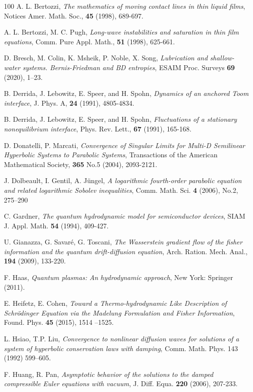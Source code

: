 \documentclass[leqno]{amsart}
\theoremstyle{plain}
\theoremstyle{definition}
\theoremstyle{remark}
\theoremstyle{plain}
\theoremstyle{plain}
\numberwithin{equation}{section}
\begin{document}
\begin{thebibliography}{100}
 A. L. Bertozzi, \emph{The mathematics of moving contact lines in thin liquid films}, Notices Amer. Math. Soc., {\bf 45} (1998), 689-697.

 A. L. Bertozzi, M. C. Pugh, \emph{Long-wave instabilities and saturation in thin film equations}, Comm. Pure Appl. Math., {\bf 51} (1998),  625-661.

 D. Bresch, M. Colin, K. Msheik, P. Noble, X. Song, \emph{Lubrication and shallow-water systems. Bernis-Friedman and BD entropies}, ESAIM Proc. Surveys {\bf 69} (2020), 1--23.

 B. Derrida, J. Lebowitz, E. Speer, and H. Spohn, \emph{Dynamics of an anchored Toom interface}, J. Phys. A, {\bf 24} (1991), 4805-4834.

 B. Derrida, J. Lebowitz, E. Speer, and H. Spohn, \emph{Fluctuations of a stationary nonequilibrium interface}, Phys. Rev. Lett., {\bf 67} (1991), 165-168.

 D. Donatelli, P. Marcati, \emph{Convergence of Singular Limits for Multi-D Semilinear Hyperbolic Systems to Parabolic Systems}, Transactions of the American Mathematical Society, {\bf 365} No.5 (2004), 2093-2121.

 J. Dolbeault, I. Gentil, A. J\"ungel, \emph{A logarithmic fourth-order parabolic equation and related logarithmic Sobolev inequalities}, Comm. Math. Sci. {\bf 4} (2006),  No.2, 275--290


 C. Gardner, \emph{The quantum hydrodynamic model for semiconductor devices}, SIAM J. Appl. Math. {\bf 54} (1994), 409-427.

 U. Gianazza, G. Savar\'e, G. Toscani, \emph{The Wasserstein gradient flow of the fisher information and the quantum drift-diffusion equation}, Arch. Ration. Mech. Anal., {\bf 194} (2009), 133-220.

 F. Haas, \emph{Quantum plasmas: An hydrodynamic approach}, New York: Springer (2011).

 E. Heifetz, E. Cohen, \emph{Toward a Thermo-hydrodynamic Like Description of Schr\"odinger Equation via the Madelung Formulation and Fisher Information}, Found. Phys. {\bf 45} (2015), 1514 --1525.

 L. Hsiao, T.P. Liu, \emph{Convergence to nonlinear diffusion waves for solutions of a system of hyperbolic
conservation laws with damping}, Comm. Math. Phys. 143 (1992) 599–605.

 F. Huang, R. Pan, \emph{Asymptotic behavior of the solutions to the damped compressible Euler equations with vacuum}, J. Diff. Equa. {\bf 220} (2006), 207-233.


\end{thebibliography}
\end{document}
